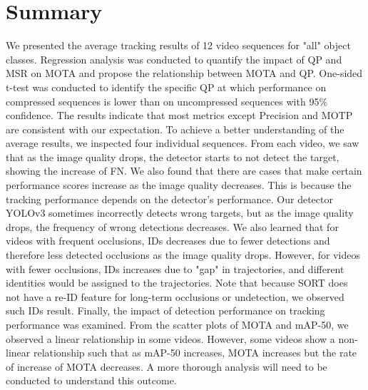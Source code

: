 \section{Summary}
\label{sec:results/summary}

We presented the average tracking results of 12 video sequences for "all" object classes. Regression analysis was conducted to quantify the impact of QP and MSR on MOTA and propose the relationship between MOTA and QP. One-sided t-test was conducted to identify the specific QP at which performance on compressed sequences is lower than on uncompressed sequences with 95\% confidence. The results indicate that most metrics except Precision and MOTP are consistent with our expectation. To achieve a better understanding of the average results, we inspected four individual sequences. From each video, we saw that as the image quality drops, the detector starts to not detect the target, showing the increase of FN. We also found that there are cases that make certain performance scores increase as the image quality decreases. This is because the tracking performance depends on the detector's performance. Our detector YOLOv3 sometimes incorrectly detects wrong targets, but as the image quality drops, the frequency of wrong detections decreases. We also learned that for videos with frequent occlusions, IDs decreases due to fewer detections and therefore less detected occlusions as the image quality drops. However, for videos with fewer occlusions, IDs increases due to "gap" in trajectories, and different identities would be assigned to the trajectories. Note that because SORT does not have a re-ID feature for long-term occlusions or undetection, we observed such IDs result. Finally, the impact of detection performance on tracking performance was examined. From the scatter plots of MOTA and mAP-50, we observed a linear relationship in some videos. However, some videos show a non-linear relationship such that as mAP-50 increases, MOTA increases but the rate of increase of MOTA decreases. A more thorough analysis will need to be conducted to understand this outcome.
